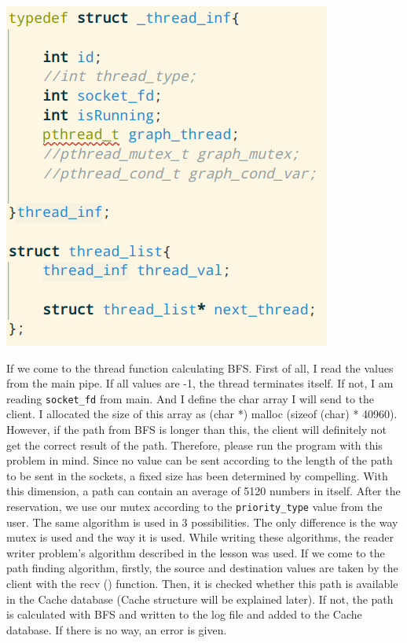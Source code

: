 \documentclass{article}
\begin{document}
\begin{center}
    \centering
    \includegraphics[scale=0.5]{threadpool.png}
    
    \label{fig:myGraph}
\end{center}


If we come to the thread function calculating BFS. First of all, I read the values from the main pipe. If all values are -1, the thread terminates itself. If not, I am reading \texttt{socket\_fd} from main. And I define the char array I will send to the client. I allocated the size of this array as (char *) malloc (sizeof (char) * 40960). However, if the path from BFS is longer than this, the client will definitely not get the correct result of the path. Therefore, please run the program with this problem in mind. Since no value can be sent according to the length of the path to be sent in the sockets, a fixed size has been determined by compelling. With this dimension, a path can contain an average of 5120 numbers in itself. After the reservation, we use our mutex according to the \texttt{priority\_type} value from the user. The same algorithm is used in 3 possibilities. The only difference is the way mutex is used and the way it is used. While writing these algorithms, the reader writer problem's algorithm described in the lesson was used. If we come to the path finding algorithm, firstly, the source and destination values are taken by the client with the recv () function. Then, it is checked whether this path is available in the Cache database (Cache structure will be explained later). If not, the path is calculated with BFS and written to the log file and added to the Cache database. If there is no way, an error is given.
\newline
\newline
\end{document}
